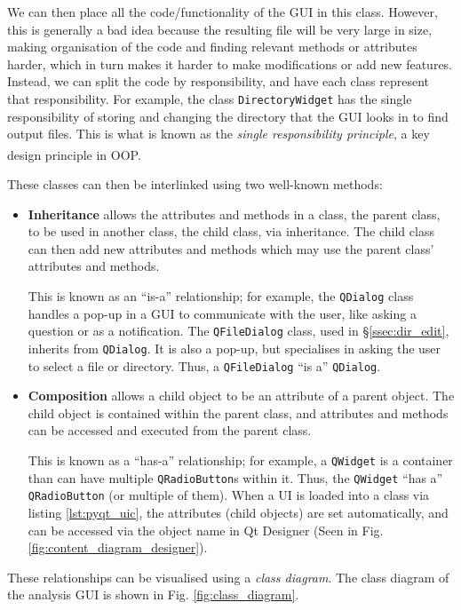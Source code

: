 \documentclass[12pt]{article}
\begin{document}
We can then place all the code/functionality of the GUI in this class. However, this is generally a bad idea because the resulting file will be very large in size, making organisation of the code and finding relevant methods or attributes harder, which in turn makes it harder to make modifications or add new features. Instead, we can split the code by responsibility, and have each class represent that responsibility. For example, the class \texttt{DirectoryWidget} has the single responsibility of storing and changing the directory that the GUI looks in to find output files. This is what is known as the \textit{single responsibility principle}, a key design principle in OOP.\textsuperscript{\cite{srp}}

These classes can then be interlinked using two well-known methods:
\begin{itemize}
    \item \textbf{Inheritance} allows the attributes and methods in a class, the parent class, to be used in another class, the child class, via inheritance. The child class can then add new attributes and methods which may use the parent class' attributes and methods.

    This is known as an ``is-a'' relationship; for example, the \texttt{QDialog} class handles a pop-up in a GUI to communicate with the user, like asking a question or as a notification. The \texttt{QFileDialog} class, used in \S\ref{ssec:dir_edit}, inherits from \texttt{QDialog}. It is also a pop-up, but specialises in asking the user to select a file or directory. Thus, a \texttt{QFileDialog} ``is a'' \texttt{QDialog}.
    \item \textbf{Composition} allows a child object to be an attribute of a parent object. The child object is contained within the parent class, and attributes and methods can be accessed and executed from the parent class.

    This is known as a ``has-a'' relationship; for example, a \texttt{QWidget} is a container than can have multiple \texttt{QRadioButton}s within it. Thus, the \texttt{QWidget} ``has a'' \texttt{QRadioButton} (or multiple of them). When a UI is loaded into a class via listing \ref{lst:pyqt_uic}, the attributes (child objects) are set automatically, and can be accessed via the object name in Qt Designer (Seen in Fig. \ref{fig:content_diagram_designer}).
\end{itemize}

These relationships can be visualised using a \textit{class diagram}. The class diagram of the analysis GUI is shown in Fig. \ref{fig:class_diagram}.
\end{document}
